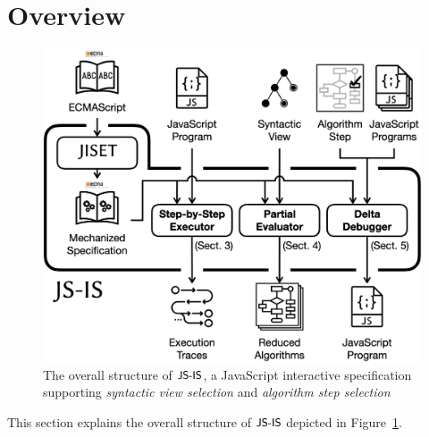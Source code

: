 \section{Overview}\label{sec:overview}

\begin{figure}
  \centering
  \includegraphics[width=\columnwidth]{img/overall.png}
  \caption{The overall structure of $\textsf{\small JS-IS}$, a JavaScript interactive
    specification supporting \textit{syntactic view selection} and
  \textit{algorithm step selection}}
  \label{fig:overall}
\end{figure}

This section explains the overall structure of $\textsf{\small JS-IS}$ depicted in
Figure~\ref{fig:overall}.

\todo

